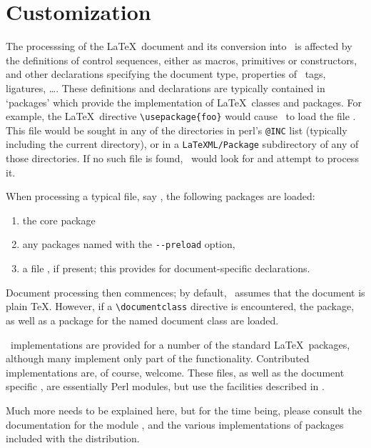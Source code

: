 \documentclass{report}
\begin{document}
\chapter{Customization}\label{customization}
The processsing of the \LaTeX\ document and its  conversion into \XML\ is affected
by the definitions of control sequences, either as macros, primitives or constructors, 
and other declarations specifying the document type, properties of \XML\ tags, ligatures, \ldots.
These definitions and declarations are typically contained in `packages' which provide
the implementation of \LaTeX\ classes and packages.  For example, the \LaTeX\ directive
\verb|\usepackage{foo}| would cause \LaTeXML\ to load the file .
This file would be sought in any of the directories in perl's \verb|@INC| list (typically
including the current directory), or in a \verb|LaTeXML/Package| subdirectory of any of 
those directories.  If no such file is found, \LaTeXML\ would look for  and
attempt to process it.

When processing a typical file, say , 
the following packages are loaded:
\begin{enumerate}
\item the core  package
\item any packages named with the \verb|--preload| option,
\item a file , if present;
      this provides for document-specific declarations.
\end{enumerate}
Document processing then commences; by default, \LaTeXML\ assumes that the document is plain \TeX.
However, if a \verb|\documentclass| directive is encountered, the  package, as well
as a package for the named document class are loaded.

\LaTeXML\ implementations are provided for a number of the standard \LaTeX\ packages,
although many implement only part of the functionality.  Contributed implementations are,
of course, welcome.  These files, as well as the document specific ,
are essentially Perl modules, but use the facilities described in .

Much more needs to be explained here, but for the time being,
please consult the documentation for the module , and
the various implementations of packages included with the distribution.

\end{document}
